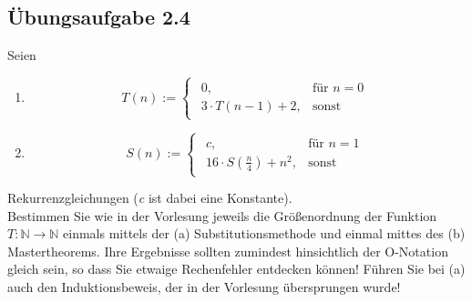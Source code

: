 \documentclass{article}
\begin{document}
\subsection{Übungsaufgabe 2.4}
\begin{flushright}
\begin{Large}
[~~~~\string| ~~8~]
\end{Large}
\end{flushright}
Seien
\begin{enumerate}
	\item 
	\[
		T(n) :=  \begin{cases}
					\begin{array}{ll}
						0, & \text{für }n=0\\
						3 \cdot T(n-1)+2, &\text{sonst}
					\end{array}
				\end{cases}
	\]
	\item
	\[
		S(n) := \begin{cases}
					\begin{array}{ll}
						c,			& \text{für }n=1\\
						16 \cdot S(\frac{n}{4})+n^2, & \text{sonst}
					\end{array}
				\end{cases}
	\]
\end{enumerate}
Rekurrenzgleichungen (\textit{c} ist dabei eine Konstante).
\vspace{0.2cm}\\
Bestimmen Sie wie in der Vorlesung jeweils die Größenordnung der Funktion $T: \mathbb{N} \rightarrow \mathbb{N}$ einmals mittels der (a) Substitutionsmethode und einmal mittes des (b) Mastertheorems.
Ihre Ergebnisse sollten zumindest hinsichtlich der O-Notation gleich sein, so dass Sie etwaige Rechenfehler entdecken können!
Führen Sie bei (a) auch den Induktionsbeweis, der in der Vorlesung übersprungen wurde!
\vspace{1cm}\\
\end{document}
